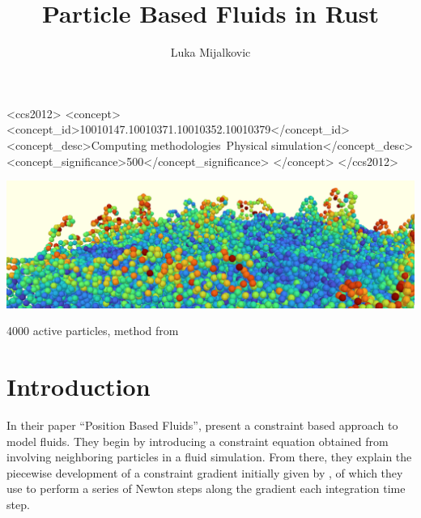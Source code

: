 \documentclass[sigplan,screen]{acmart}
\begin{document}
\title{Particle Based Fluids in Rust}

\author{Luka Mijalkovic}

\renewcommand{\shortauthors}{Luka Mijalkovic}


\begin{CCSXML}
<ccs2012>
   <concept>
       <concept_id>10010147.10010371.10010352.10010379</concept_id>
       <concept_desc>Computing methodologies~Physical simulation</concept_desc>
       <concept_significance>500</concept_significance>
       </concept>
 </ccs2012>
\end{CCSXML}



\begin{teaserfigure}
  \includegraphics[width=\textwidth]{images/teaser.png}
  \caption{4000 active particles, method from \cite{Muller}}
  \label{fig:teaser}
\end{teaserfigure}

\renewcommand\footnotetextcopyrightpermission[1]{} %
\pagestyle{plain} %

\maketitle

\section{Introduction}
In their paper ``Position Based Fluids'', \cite{Muller} present a constraint based approach to model fluids. They begin by introducing a constraint equation obtained from \cite{Bodin} involving neighboring particles in a fluid simulation. From there, they explain the piecewise development of a constraint gradient initially given by \cite{Monaghan1992}, of which they use to perform a series of Newton steps along the gradient each integration time step.
\end{document}
